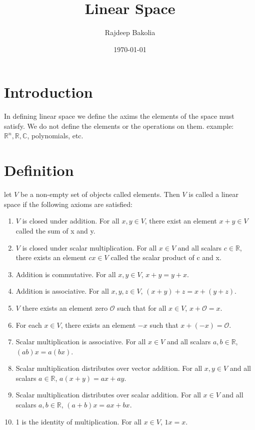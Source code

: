 \documentclass{article}
\begin{document}
\title{Linear Space}
\author{Rajdeep Bakolia}
\date{\today}
\maketitle

\section{Introduction}
In defining linear space we define the axims the elements of the space must satisfy.
We do not define the elements or the operations on them.
example: \( \mathbb{R}^n, \mathbb{R}, \mathbb{C} \), polynomials, etc.
\section{Definition}
let $V$ be a non-empty set of objects called elements. Then $V$ is
called a linear space if the following axioms are satisfied:
\begin{enumerate}
    \item $V$ is closed under addition. For all $x,y \in V$, there exist an element $x+y \in V$ called the sum of x and y.
    \item $V$ is closed under scalar multiplication. For all $x \in V$ and all scalars $c \in  \mathbb{R} $, there exists an element $cx \in V$ called the scalar product of c and x.
    \item Addition is commutative. For all $x,y \in V$, $x+y = y+x$.
    \item Addition is associative. For all $x,y,z \in V$, $(x+y)+z = x+(y+z)$.
    \item $V$ there exists an element zero $\mathcal{O}$ such that for all $x \in V$, $x+\mathcal{O} = x$.
    \item For each $x \in V$, there exists an element $-x$ such that $x+(-x) = \mathcal{O}$.
    \item Scalar multiplication is associative. For all $x \in V$ and all scalars $a,b \in \mathbb{R}$, $(ab)x = a(bx)$.
    \item Scalar multiplication distributes over vector addition. For all $x,y \in V$ and all scalars $a \in \mathbb{R}$, $a(x+y) = ax + ay$.
    \item Scalar multiplication distributes over scalar addition. For all $x \in V$ and all scalars $a,b \in \mathbb{R}$, $(a+b)x = ax + bx$.
    \item 1 is the identity of multiplication. For all $x \in V$, $1x = x$.
\end{enumerate}
\end{document}
